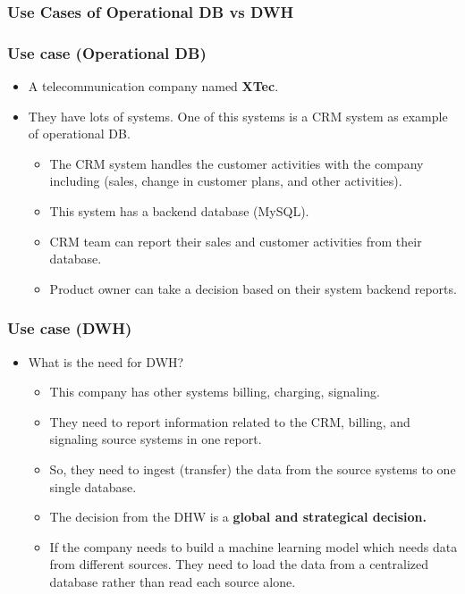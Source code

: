 \subsubsection{Use Cases of Operational DB vs DWH}

\begin{frame}
\frametitle{Use case (Operational DB)}

\begin{itemize}[<+->]

\item A telecommunication company named \textbf{XTec}.
\newline
\item They have lots of systems. One of this systems is a CRM system as example of operational DB.
\begin{itemize}[<+->]

\item The CRM system handles the customer activities with the company including (sales, change in customer plans, and other activities).
\item This system has a backend database (MySQL).
\item CRM team can report their sales and customer activities from their database.
\item Product owner can take a decision based on their system backend reports.

\end{itemize}

\end{itemize}

\end{frame}


\begin{frame}
\frametitle{Use case (DWH)}

\begin{itemize}[<+->]

\item What is the need for DWH?		
\begin{itemize}[<+->]
\item This company has other systems \forexample billing, charging, signaling.	
\item They need to report information related to the CRM, billing, and signaling source systems in one report.
\item So, they need to ingest (transfer) the data from the source systems to one single database.
\item The decision from the DHW is a \textbf{global and strategical decision.}
\item If the company needs to build a machine learning model which needs data from different sources. They need to load the data from a centralized database rather than read each source alone.
\end{itemize}

\end{itemize}

\end{frame}


